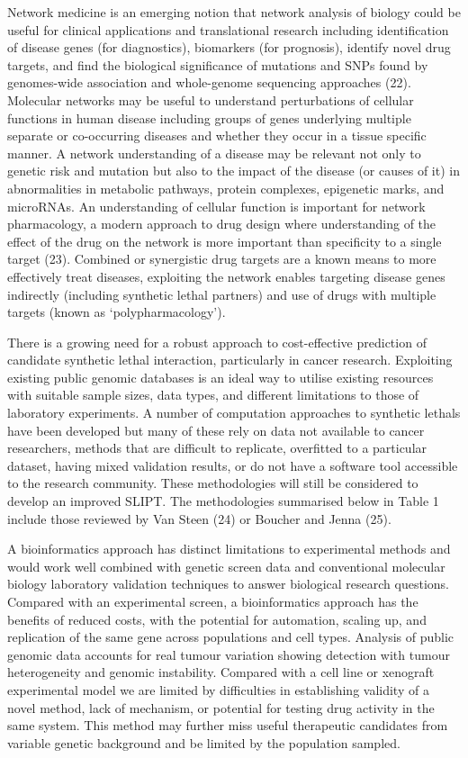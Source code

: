 Network medicine is an emerging notion that network analysis of biology could be useful for clinical applications and translational research including identification of disease genes (for diagnostics), biomarkers (for prognosis), identify novel drug targets, and find the biological significance of \glspl{mutation} and \glspl{SNP} found by \glspl{genome}-wide association and whole-genome sequencing approaches (22). Molecular networks may be useful to understand perturbations of cellular functions in human disease including groups of genes underlying multiple separate or co-occurring diseases and whether they occur in a tissue specific manner. A network understanding of a disease may be relevant not only to genetic risk and \gls{mutation} but also to the impact of the disease (or causes of it) in abnormalities in metabolic pathways, protein complexes, epigenetic marks, and \glspl{microRNA}. An understanding of cellular function is important for network pharmacology, a modern approach to drug design where understanding of the effect of the drug on the network is more important than specificity to a single target (23). Combined or synergistic drug targets are a known means to more effectively treat diseases, exploiting the network enables targeting disease genes indirectly (including \gls{synthetic lethal} partners) and use of drugs with multiple targets (known as ‘polypharmacology’). 

There is a growing need for a robust approach to cost-effective prediction of candidate \gls{synthetic lethal} interaction, particularly in cancer research. Exploiting existing public \gls{genomic} databases is an ideal way to utilise existing resources with suitable sample sizes, data types, and different limitations to those of laboratory experiments. A number of computation approaches to \glspl{synthetic lethal} have been developed but many of these rely on data not available to cancer researchers, methods that are difficult to replicate, overfitted to a particular dataset, having mixed validation results, or do not have a software tool accessible to the research community. These methodologies will still be considered to develop an improved \gls{SLIPT}. The methodologies summarised below in Table 1 include those reviewed by Van Steen (24) or Boucher and Jenna (25). 

A \gls{bioinformatics} approach has distinct limitations to experimental methods and would work well combined with genetic screen data and conventional molecular biology laboratory validation techniques to answer biological research questions. Compared with an experimental screen, a \gls{bioinformatics} approach has the benefits of reduced costs, with the potential for automation, scaling up, and replication of the same gene across populations and cell types. Analysis of public \gls{genomic} data accounts for real tumour variation showing detection with tumour heterogeneity and genomic instability. Compared with a cell line or xenograft experimental model we are limited by difficulties in establishing validity of a novel method, lack of mechanism, or potential for testing drug activity in the same system. This method may further miss useful therapeutic candidates from variable genetic background and be limited by the population sampled.

